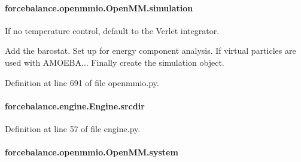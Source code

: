 \hypertarget{classforcebalance_1_1openmmio_1_1OpenMM_ae8231543cc70b8dcc3e832a185ef3d2f}{
\paragraph[{simulation}]{\setlength{\rightskip}{0pt plus 5cm}forcebalance.\-openmmio.\-Open\-M\-M.\-simulation}}\label{classforcebalance_1_1openmmio_1_1OpenMM_ae8231543cc70b8dcc3e832a185ef3d2f}


If no temperature control, default to the Verlet integrator. 

Add the barostat. Set up for energy component analysis. If virtual particles are used with A\-M\-O\-E\-B\-A... Finally create the simulation object. 

Definition at line 691 of file openmmio.\-py.

\hypertarget{classforcebalance_1_1engine_1_1Engine_ad9c499329de6299f0b8acf898d71e7d5}{
\paragraph[{srcdir}]{\setlength{\rightskip}{0pt plus 5cm}forcebalance.\-engine.\-Engine.\-srcdir\hspace{0.3cm}{\ttfamily [inherited]}}}\label{classforcebalance_1_1engine_1_1Engine_ad9c499329de6299f0b8acf898d71e7d5}


Definition at line 57 of file engine.\-py.

\hypertarget{classforcebalance_1_1openmmio_1_1OpenMM_a581ef690c2bc0e0fa239b7d36cc7d790}{
\paragraph[{system}]{\setlength{\rightskip}{0pt plus 5cm}forcebalance.\-openmmio.\-Open\-M\-M.\-system}}\label{classforcebalance_1_1openmmio_1_1OpenMM_a581ef690c2bc0e0fa239b7d36cc7d790}


